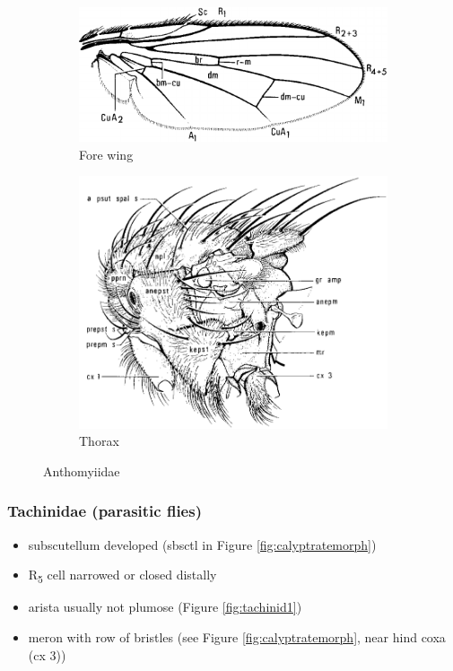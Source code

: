 \documentclass[letterpaper, 11pt]{article}
\begin{document}
\begin{figure}[ht!]
    \centering
    \begin{subfigure}[ht!]{0.5\textwidth}
        \includegraphics[width=\textwidth]{AnthomyiidWing}
        \caption{Fore wing \citep[][Fig. 104.29]{mcalpine1981manualv2}}
        \label{fig:anthomyiid1}
    \end{subfigure}
    \qquad
    \begin{subfigure}[ht!]{0.4\textwidth}
        \includegraphics[width=\textwidth]{AnthomyiidThorax}
        \caption{Thorax \citep[][Fig. 104.18]{mcalpine1981manualv2}}
        \label{fig:anthomyiid2}
    \end{subfigure}
    \caption{Anthomyiidae}\label{fig:anthomyiids}
\end{figure}

\subsubsection{Tachinidae (parasitic flies)}
\begin{itemize}
\item subscutellum developed (sbsctl in Figure \ref{fig:calyptratemorph})
\item \texorpdfstring{R\textsubscript{5}}{R5} cell narrowed or closed distally
\item arista usually not plumose (Figure \ref{fig:tachinid1})
\item meron with row of bristles (see Figure \ref{fig:calyptratemorph}, near hind coxa (cx 3))
\end{itemize}
\end{document}

